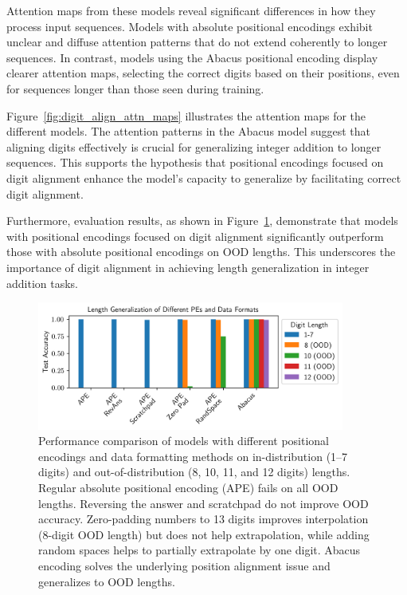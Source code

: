 Attention maps from these models reveal significant differences in how they process input sequences. Models with absolute positional encodings exhibit unclear and diffuse attention patterns that do not extend coherently to longer sequences. In contrast, models using the Abacus positional encoding display clearer attention maps, selecting the correct digits based on their positions, even for sequences longer than those seen during training.

Figure~\ref{fig:digit_align_attn_maps} illustrates the attention maps for the different models. The attention patterns in the Abacus model suggest that aligning digits effectively is crucial for generalizing integer addition to longer sequences. This supports the hypothesis that positional encodings focused on digit alignment enhance the model's capacity to generalize by facilitating correct digit alignment.

Furthermore, evaluation results, as shown in Figure~\ref{fig:pe_results}, demonstrate that models with positional encodings focused on digit alignment significantly outperform those with absolute positional encodings on OOD lengths. This underscores the importance of digit alignment in achieving length generalization in integer addition tasks.

\begin{figure}[!h]
  \centering
  \includegraphics[width=0.9\textwidth]{fig/pe_results.png}
  \caption{Performance comparison of models with different positional encodings and data formatting methods on in-distribution (1--7 digits) and out-of-distribution (8, 10, 11, and 12 digits) lengths. Regular absolute positional encoding (APE) fails on all OOD lengths. Reversing the answer and scratchpad do not improve OOD accuracy. Zero-padding numbers to 13 digits improves interpolation (8-digit OOD length) but does not help extrapolation, while adding random spaces helps to partially extrapolate by one digit. Abacus encoding solves the underlying position alignment issue and generalizes to OOD lengths.}
  \label{fig:pe_results}
\end{figure}


